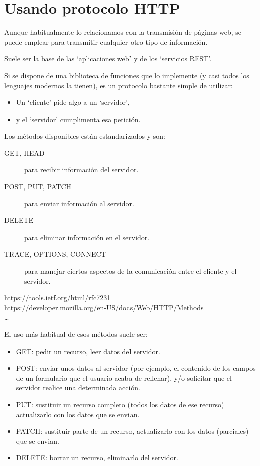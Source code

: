 \documentclass[spanish,12pt,a4paper,final,oneside]{book}
\begin{document}
\section{Usando protocolo HTTP}
Aunque habitualmente lo relacionamos con la transmisión de páginas web, se puede emplear para transmitir cualquier otro tipo de información.

Suele ser la base de las `aplicaciones web' y de los `servicios REST'.

Si se dispone de una biblioteca de funciones que lo implemente (y casi todos los lenguajes modernos la tienen), es un protocolo bastante simple de utilizar:
\begin{itemize}
\item Un `cliente' pide algo a un `servidor', 
\item y el `servidor' cumplimenta esa petición.
\end{itemize}

Los métodos disponibles están estandarizados y son:
\begin{description}
\item[GET, HEAD] para recibir información del servidor.
\item[POST, PUT, PATCH] para enviar información al servidor.
\item[DELETE] para eliminar información en el servidor.
\item[TRACE, OPTIONS, CONNECT] para manejar ciertos aspectos de la comunicación entre el cliente y el servidor.
\end{description}

\url{https://tools.ietf.org/html/rfc7231}
\\ \url{https://developer.mozilla.org/en-US/docs/Web/HTTP/Methods}
\\ \ldots

El uso más habitual de esos métodos suele ser:
\begin{itemize}

\item GET: pedir un recurso, leer datos del servidor.

\item POST: enviar unos datos al servidor (por ejemplo, el contenido de los campos de un formulario que el usuario acaba de rellenar), y/o solicitar que el servidor realice una determinada acción.

\item PUT: sustituir un recurso completo (todos los datos de ese recurso) actualizarlo con los datos que se envian.

\item PATCH: sustituir parte de un recurso, actualizarlo con los datos (parciales) que se envian.

\item DELETE: borrar un recurso, eliminarlo del servidor.

\end{itemize}
\end{document}

